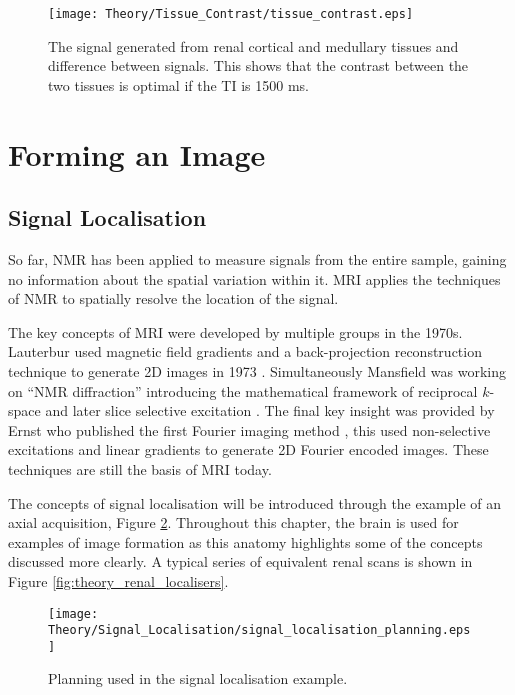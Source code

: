 \begin{figure}[H]
	\centering
	\texttt{[image: Theory/Tissue\_Contrast/tissue\_contrast.eps]}
	\caption{The signal generated from renal cortical and medullary tissues \cite{cox_multiparametric_2017} and difference between signals. This shows that the contrast between the two tissues is optimal if the \acf{TI} is 1500 ms.}
	\label{fig:theorgy_tissue_contrast}	
\end{figure}

\newpage
\section{Forming an Image}
\label{sec:theory_forming_an_image}
\subsection{Signal Localisation}
So far, \ac{NMR} has been applied to measure signals from the entire sample, gaining no information about the spatial variation within it. \ac{MRI} applies the techniques of \ac{NMR} to spatially resolve the location of the signal.

The key concepts of \ac{MRI} were developed by multiple groups in the 1970s. Lauterbur used magnetic field gradients and a back-projection reconstruction technique to generate 2D images in 1973 \cite{lauterbur_image_1973}. Simultaneously Mansfield was working on ``\ac{NMR} diffraction'' introducing the mathematical framework of reciprocal $k$-space \cite{mansfield_nmr_1973} and later slice selective excitation \cite{garroway_image_1974}. The final key insight was provided by Ernst who published the first Fourier imaging method \cite{kumar_nmr_1975}, this used non-selective excitations and linear gradients to generate 2D Fourier encoded images. These techniques are still the basis of \ac{MRI} today.

The concepts of signal localisation will be introduced through the example of an axial acquisition, Figure \ref{fig:theory_axial_planning}. Throughout this chapter, the brain is used for examples of image formation as this anatomy highlights some of the concepts discussed more clearly. A typical series of equivalent renal scans is shown in Figure \ref{fig:theory_renal_localisers}.
\begin{figure}[H]
	\centering
	\texttt{[image: Theory/Signal\_Localisation/signal\_localisation\_planning.eps]}
	\caption{Planning used in the signal localisation example.}
	\label{fig:theory_axial_planning}	
\end{figure}

